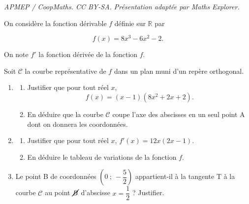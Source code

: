 \documentclass[10pt]{article}
\providecommand{\R}{\mathbb{R}}
\begin{document}
\noindent\textit{APMEP / CoopMaths. CC BY-SA. Présentation adaptée par Maths Explorer.}\par\medskip
\medskip

On considère la fonction dérivable $f$ définie sur $\R$ par 

\[f(x) = 8x^3 - 6x^2 - 2.\]

On note $f'$ la fonction dérivée de la fonction $f$.

Soit $\mathcal{C}$ la courbe représentative de $f$ dans un plan muni d'un repère orthogonal.

\medskip

\begin{enumerate}
\item
\begin{enumerate}
\item Justifier que pour tout réel $x$, \[f(x) = (x - 1)\left( 8x^2 + 2x + 2\right).\]
\item En déduire que la courbe $\mathcal{C}$ coupe l'axe des abscisses en un seul point A dont on donnera
les coordonnées.
\end{enumerate}
\item 
	\begin{enumerate}
		\item  Justifier que pour tout réel $x$, $f'(x) = 12x(2x - 1)$.
		\item  En déduire le tableau de variations de la fonction $f$.
	\end{enumerate}
\item Le point B de coordonnées $\left(0~;~-\dfrac{5}{2}\right)$ appartient-il à la tangente T à la courbe $\mathcal{C}$ au point $\cancel{B}$
d'abscisse $x = \dfrac{1}{2}$ ? Justifier.
\end{enumerate}

\vspace{0,5cm}
\end{document}
